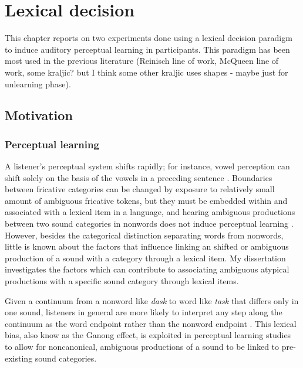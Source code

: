 
\chapter{Lexical decision}

This chapter reports on two experiments done using a lexical decision paradigm to induce auditory perceptual learning in participants.  This paradigm has been most used in the previous literature (Reinisch line of work, McQueen line of work, some kraljic? but I think some other kraljic uses shapes - maybe just for unlearning phase).

\section{Motivation}

\subsection{Perceptual learning}

A listener's perceptual system shifts rapidly; for instance, vowel perception can shift solely on the basis of the vowels in a  preceding sentence \citep{Ladefoged1957}.  Boundaries between fricative categories can be changed by exposure to relatively small amount of ambiguous fricative tokens, but they must be embedded within and associated with a lexical item in a language, and hearing ambiguous productions between two sound categories in nonwords does not induce perceptual learning \citep{Norris2003}. However, besides the categorical distinction separating words from nonwords, little is known about the factors that influence linking an shifted or ambiguous production of a sound with a category through a lexical item. My dissertation investigates the factors which can contribute to associating ambiguous atypical productions with a specific sound category through lexical items. 

Given a continuum from a nonword like \emph{dask} to word like \emph{task} that differs only in one sound, listeners in general are more likely to interpret any step along the continuum as the word endpoint rather than the nonword endpoint \citep{Ganong1980}. This lexical bias, also know as the Ganong effect, is exploited in perceptual learning studies to allow for noncanonical, ambiguous productions of a sound to be linked to pre-existing sound categories.

